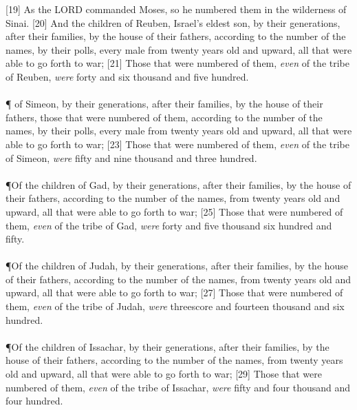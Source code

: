 [19] \textcolor[cmyk]{0.99998,1,0,0}{As the LORD commanded Moses, so he numbered them in the wilderness of Sinai. }
[20] \textcolor[cmyk]{0.99998,1,0,0}{And the children of Reuben, Israel's eldest son, by their generations, after their families, by the house of their fathers, according to the number of the names, by their polls, every male from twenty years old and upward, all that were able to go forth to war; }
[21] \textcolor[cmyk]{0.99998,1,0,0}{Those that were numbered of them, \emph{even} of the tribe of Reuben, \emph{were} forty and six thousand and five hundred.}\\
\\
\P \textcolor[cmyk]{0.99998,1,0,0}{ of Simeon, by their generations, after their families, by the house of their fathers, those that were numbered of them, according to the number of the names, by their polls, every male from twenty years old and upward, all that were able to go forth to war;}
[23] \textcolor[cmyk]{0.99998,1,0,0}{Those that were numbered of them, \emph{even} of the tribe of Simeon, \emph{were} fifty and nine thousand and three hundred. }\\
\\
\P \textcolor[cmyk]{0.99998,1,0,0}{Of the children of Gad, by their generations, after their families, by the house of their fathers, according to the number of the names, from twenty years old and upward, all that were able to go forth to war;}
[25] \textcolor[cmyk]{0.99998,1,0,0}{Those that were numbered of them, \emph{even} of the tribe of Gad, \emph{were} forty and five thousand six hundred and fifty. }\\
\\
\P \textcolor[cmyk]{0.99998,1,0,0}{Of the children of Judah, by their generations, after their families, by the house of their fathers, according to the number of the names, from twenty years old and upward, all that were able to go forth to war;}
[27] \textcolor[cmyk]{0.99998,1,0,0}{Those that were numbered of them, \emph{even} of the tribe of Judah, \emph{were} threescore and fourteen thousand and six hundred.}\\
\\
\P \textcolor[cmyk]{0.99998,1,0,0}{Of the children of Issachar, by their generations, after their families, by the house of their fathers, according to the number of the names, from twenty years old and upward, all that were able to go forth to war;}
[29] \textcolor[cmyk]{0.99998,1,0,0}{Those that were numbered of them, \emph{even} of the tribe of Issachar, \emph{were} fifty and four thousand and four hundred.}\\
